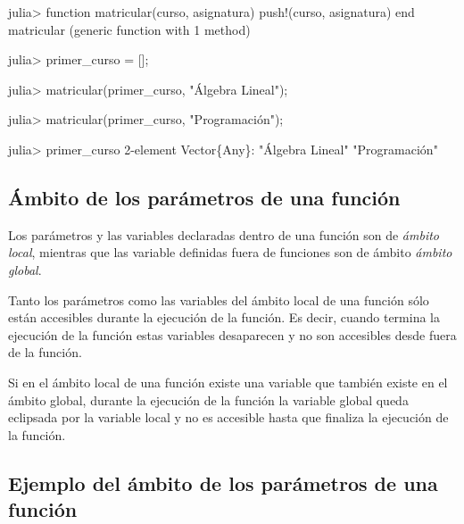 \documentclass[
  letterpaper,
  DIV=11,
  numbers=noendperiod]{scrreprt}
\newenvironment{Shaded}{\begin{snugshade}}{\end{snugshade}}
\newcommand{\DataTypeTok}[1]{\textcolor[rgb]{0.68,0.00,0.00}{#1}}
\newcommand{\FloatTok}[1]{\textcolor[rgb]{0.68,0.00,0.00}{#1}}
\newcommand{\FunctionTok}[1]{\textcolor[rgb]{0.28,0.35,0.67}{#1}}
\newcommand{\KeywordTok}[1]{\textcolor[rgb]{0.00,0.23,0.31}{#1}}
\newcommand{\NormalTok}[1]{\textcolor[rgb]{0.00,0.23,0.31}{#1}}
\newcommand{\OperatorTok}[1]{\textcolor[rgb]{0.37,0.37,0.37}{#1}}
\newcommand{\StringTok}[1]{\textcolor[rgb]{0.13,0.47,0.30}{#1}}
\begin{document}
\begin{Shaded}
\begin{Highlighting}[]
\NormalTok{julia}\OperatorTok{\textgreater{}} \KeywordTok{function} \FunctionTok{matricular}\NormalTok{(curso, asignatura)}
       \FunctionTok{push!}\NormalTok{(curso, asignatura)}
       \KeywordTok{end}
\NormalTok{matricular (generic }\KeywordTok{function}\NormalTok{ with }\FloatTok{1}\NormalTok{ method)}

\NormalTok{julia}\OperatorTok{\textgreater{}}\NormalTok{ primer\_curso }\OperatorTok{=}\NormalTok{ [];}

\NormalTok{julia}\OperatorTok{\textgreater{}} \FunctionTok{matricular}\NormalTok{(primer\_curso, }\StringTok{"Álgebra Lineal"}\NormalTok{);}

\NormalTok{julia}\OperatorTok{\textgreater{}} \FunctionTok{matricular}\NormalTok{(primer\_curso, }\StringTok{"Programación"}\NormalTok{);}

\NormalTok{julia}\OperatorTok{\textgreater{}}\NormalTok{ primer\_curso}
\FloatTok{2}\OperatorTok{{-}}\NormalTok{element }\DataTypeTok{Vector}\NormalTok{\{}\DataTypeTok{Any}\NormalTok{\}}\OperatorTok{:}
 \StringTok{"Álgebra Lineal"}
 \StringTok{"Programación"}
\end{Highlighting}
\end{Shaded}

\hypertarget{uxe1mbito-de-los-paruxe1metros-de-una-funciuxf3n}{%
\subsection{Ámbito de los parámetros de una
función}\label{uxe1mbito-de-los-paruxe1metros-de-una-funciuxf3n}}

Los parámetros y las variables declaradas dentro de una función son de
\emph{ámbito local}, mientras que las variable definidas fuera de
funciones son de ámbito \emph{ámbito global}.

Tanto los parámetros como las variables del ámbito local de una función
sólo están accesibles durante la ejecución de la función. Es decir,
cuando termina la ejecución de la función estas variables desaparecen y
no son accesibles desde fuera de la función.

Si en el ámbito local de una función existe una variable que también
existe en el ámbito global, durante la ejecución de la función la
variable global queda eclipsada por la variable local y no es accesible
hasta que finaliza la ejecución de la función.

\hypertarget{ejemplo-del-uxe1mbito-de-los-paruxe1metros-de-una-funciuxf3n}{%
\subsection{Ejemplo del ámbito de los parámetros de una
función}\label{ejemplo-del-uxe1mbito-de-los-paruxe1metros-de-una-funciuxf3n}}
\end{document}
